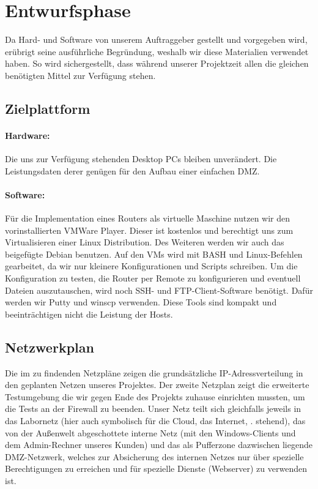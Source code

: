\section{Entwurfsphase} 
\label{sec:Entwurfsphase}
Da Hard- und Software von unserem Auftraggeber gestellt und vorgegeben wird, erübrigt seine ausführliche Begründung, weshalb wir diese Materialien verwendet haben. So wird sichergestellt, dass während unserer Projektzeit allen die gleichen benötigten Mittel zur Verfügung stehen.

\subsection{Zielplattform}
\label{sec:Zielplattform}

\paragraph*{Hardware: } 
Die uns zur Verfügung stehenden Desktop PCs bleiben unverändert. Die Leistungsdaten derer  genügen für den Aufbau einer einfachen DMZ.

\paragraph*{Software: } 
Für die Implementation eines Routers als virtuelle Maschine nutzen wir den vorinstallierten VMWare Player. Dieser ist kostenlos und berechtigt uns zum Virtualisieren einer Linux Distribution. Des Weiteren werden wir auch das beigefügte Debian benutzen. Auf den VMs wird mit BASH und Linux-Befehlen gearbeitet, da wir nur kleinere Konfigurationen und Scripts schreiben. Um die Konfiguration zu testen, die Router per Remote zu konfigurieren und eventuell Dateien auszutauschen, wird noch SSH- und FTP-Client-Software benötigt. Dafür werden wir Putty und winscp verwenden. Diese Tools sind kompakt und beeinträchtigen nicht die Leistung der Hosts.

\subsection{Netzwerkplan}
\label{sec:Geschaeftslogik}

Die im  zu findenden Netzpläne zeigen die grundsätzliche IP-Adressverteilung in den geplanten Netzen unseres Projektes.
Der zweite Netzplan zeigt die erweiterte Testumgebung die wir gegen Ende des Projekts zuhause einrichten mussten, um die Tests an der Firewall zu beenden. 
Unser Netz teilt sich gleichfalls jeweils in das Labornetz (hier auch symbolisch für die Cloud, das Internet, \etc. stehend), das von der Außenwelt abgeschottete interne Netz (mit den Windows-Clients und dem Admin-Rechner unseres Kunden) und das als Pufferzone dazwischen liegende \ac{DMZ}-Netzwerk, welches zur Absicherung des internen Netzes nur über spezielle Berechtigungen zu erreichen und für spezielle Dienste (Webserver) zu verwenden ist.

